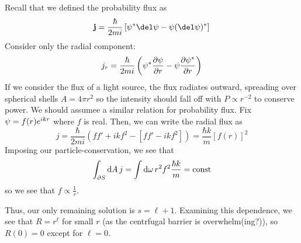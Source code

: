 \begin{aside}
	Recall that we defined the probability flux as
	\[\vb j = \frac{\hbar}{2mi}\left[\p\ast\del\p - \p(\del\p)\ast\right]\]
	Consider only the radial component:
	\[j_r = \frac{\hbar}{2mi}\left(\p\ast\pder{\p}{r}-\p\pder{\p\ast}{r}\right)\]
	If we consider the flux of a light source, the flux radiates outward, spreading over spherical shells \(A=4\pi r^2\) so the intensity should fall off with \(P\propto r^{-2}\) to conserve power. We should assumee a similar relation for probability flux. Fix \(\psi = f(r)e^{ikr}\) where \(f\) is real. Then, we can write the radial flux as
	\[j = \frac{\hbar}{2mi}\left(ff'+ikf^2-[ff'-ikf^2]\right) = \frac{\hbar k}{m} \left[f(r)\right]^2\]
	Imposing our particle-conservation, we see that 
	\[\int_{\partial S}\d{A} j = \int\d\omega r^2f^2\frac{\hbar k}{m}=\text{const}\]
	so we see that \(f\propto\frac{1}{r}\).
\end{aside}

Thus, our only remaining solution is \(s = \ell+1\). Examining this dependence, we see that \(R=r^\ell\) for small \(r\) (as the centrfugal barrier is overwhelm(ing?)), so \(R(0) = 0\) except for \(\ell = 0\).

